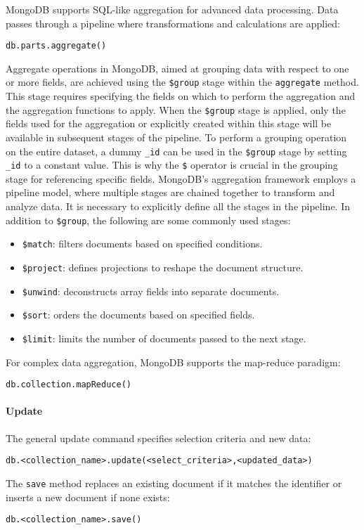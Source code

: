 MongoDB supports SQL-like aggregation for advanced data processing. 
Data passes through a pipeline where transformations and calculations are applied:
\begin{lstlisting}[style=MongoDB]
db.parts.aggregate()
\end{lstlisting}
Aggregate operations in MongoDB, aimed at grouping data with respect to one or more fields, are achieved using the \texttt{\$group} stage within the \texttt{aggregate} method.
This stage requires specifying the fields on which to perform the aggregation and the aggregation functions to apply. 
When the \texttt{\$group} stage is applied, only the fields used for the aggregation or explicitly created within this stage will be available in subsequent stages of the pipeline. 
To perform a grouping operation on the entire dataset, a dummy \texttt{\_id} can be used in the \texttt{\$group} stage by setting \texttt{\_id} to a constant value. 
This is why the \texttt{\$} operator is crucial in the grouping stage for referencing specific fields.
MongoDB's aggregation framework employs a pipeline model, where multiple stages are chained together to transform and analyze data. 
It is necessary to explicitly define all the stages in the pipeline. 
In addition to \texttt{\$group}, the following are some commonly used stages:
\begin{itemize}
    \item \texttt{\$match}: filters documents based on specified conditions.
    \item \texttt{\$project}: defines projections to reshape the document structure.
    \item \texttt{\$unwind}: deconstructs array fields into separate documents.
    \item \texttt{\$sort}: orders the documents based on specified fields.
    \item \texttt{\$limit}: limits the number of documents passed to the next stage.
\end{itemize}
\noindent For complex data aggregation, MongoDB supports the map-reduce paradigm:
\begin{lstlisting}[style=MongoDB]
db.collection.mapReduce()
\end{lstlisting}

\paragraph*{Update}
The general update command specifies selection criteria and new data:
\begin{lstlisting}[style=MongoDB]
db.<collection_name>.update(<select_criteria>,<updated_data>)
\end{lstlisting}
The \texttt{save} method replaces an existing document if it matches the identifier or inserts a new document if none exists:
\begin{lstlisting}[style=MongoDB]
db.<collection_name>.save()
\end{lstlisting}

